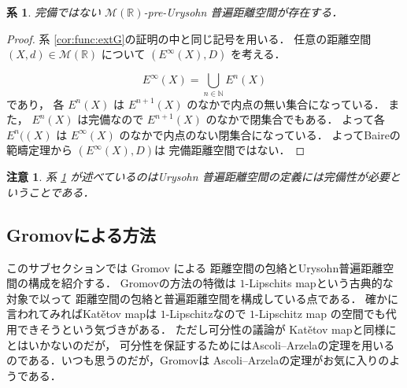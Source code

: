 \documentclass[leqno, 12pt]{jsarticle}
\newtheorem{cor}[thm]{系}
\newtheorem*{rmk}{注意}
\newcommand{\nn}{\mathbb{N}}
\newcommand{\rr}{\mathbb{R}}
\begin{document}
\begin{cor}\label{cor:func:noncomp}
完備ではない
$\mathscr{M}(\rr)$-pre-Urysohn
普遍距離空間が存在する．
\end{cor}
\begin{proof}
系
 \ref{cor:func:extG}の証明の中と同じ記号を用いる．
任意の距離空間
$(X, d)\in \mathscr{M}(\rr)$
について
$(E^{\infty}(X), D)$
を考える．




\[
E^{\infty}(X)=\bigcup_{n\in \nn}E^{n}(X)
\]
であり，
各
$E^{n}(X)$
は
$E^{n+1}(X)$
のなかで内点の無い集合になっている．
また，
$E^{n}(X)$
は完備なので
$E^{n+1}(X)$
のなかで閉集合でもある．
よって各
$E^{n}((X)$
は
$E^{\infty}(X)$
のなかで内点のない閉集合になっている．
よってBaireの範疇定理から
$(E^{\infty}(X), D)$は
完備距離空間ではない．
\end{proof}
\begin{rmk}
系 
\ref{cor:func:noncomp}
が述べているのはUrysohn
普遍距離空間の定義には完備性が必要ということである．
\end{rmk}



\subsection{Gromovによる方法}
このサブセクションでは
Gromov 
\cite{Greenbook}
による
距離空間の包絡とUrysohn普遍距離空間の構成を紹介する．
Gromovの方法の特徴は
$1$-Lipschits mapという古典的な対象で以って
距離空間の包絡と普遍距離空間を構成している点である．
確かに言われてみればKat\v{e}tov mapは
$1$-Lipschitzなので
$1$-Lipschitz map
の空間でも代用できそうという気づきがある．
ただし可分性の議論が
Kat\v{e}tov mapと同様にとはいかないのだが，
可分性を保証するためにはAscoli--Arzelaの定理を用いるのである．いつも思うのだが，Gromovは
Ascoli--Arzelaの定理がお気に入りのようである．
\end{document}
